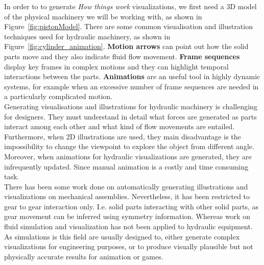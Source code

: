 \documentclass[11pt]{report}
\begin{document}
In order to to generate \textit{How things work} visualizations, we first need a 3D model of the physical machinery we will be working with, as shown in Figure~\ref{fig:pistonModel}.
There are some common visualisation and illustration techniques used for hydraulic machinery, as shown in Figure~\ref{fig:cylinder_animation}.
\textbf{Motion arrows} can point out how the solid parts move and they also indicate fluid flow movement.
\textbf{Frame sequences} display key frames in complex motions and they can highlight temporal interactions between the parts.
\textbf{Animations} are an useful tool in highly dynamic systems, for example when an excessive number of frame sequences are needed in a particularly complicated motion.\\

Generating visualisations and illustrations for hydraulic machinery is challenging for designers.
They must understand in detail what forces are generated as parts interact among each other and what kind of flow movements are entailed.
Furthermore, when 2D illustrations are used, they main disadvantage is the impossibility to change the viewpoint to explore the object from different angle.
Moreover, when animations for hydraulic visualizations are generated, they are infrequently updated. 
Since manual animation is a costly and time consuming task.\\

There has been some work done on automatically generating illustrations and visualizations on mechanical assemblies.
Nevertheless, it has been restricted to gear to gear interaction only.
I.e. solid parts interacting with other solid parts, as gear movement can be inferred using symmetry information.
Whereas work on fluid simulation and visualization has not been applied to hydraulic equipment.
As simulations is this field are usually designed to, either generate complex visualizations for engineering purposes, or to produce visually plausible but not physically accurate results for animation or games.\\
\end{document}
